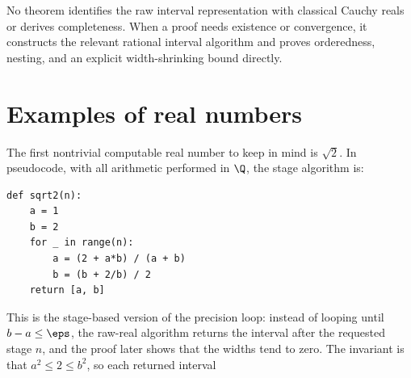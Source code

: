 \begin{remark}\label{rem:real-completeness}
No theorem identifies the raw interval representation with classical Cauchy
reals or derives completeness.  When a proof needs existence or convergence,
it constructs the relevant rational interval algorithm and proves orderedness,
nesting, and an explicit width-shrinking bound directly.
\end{remark}

\section{Examples of real numbers \humanchecked}

\begin{remark}
\label{rem:algebraic-numbers-sqrt-two}
The first nontrivial computable real number to keep in mind is \(\sqrt2\).
In pseudocode, with all arithmetic performed in \(\Q\), the stage algorithm is:
\begin{verbatim}
def sqrt2(n):
    a = 1
    b = 2
    for _ in range(n):
        a = (2 + a*b) / (a + b)
        b = (b + 2/b) / 2
    return [a, b]
\end{verbatim}
This is the stage-based version of the precision loop: instead of looping
until \(b-a\le\eps\), the raw-real algorithm returns the interval after the
requested stage \(n\), and the proof later shows that the widths tend to
zero.  The invariant is that \(a^2\le 2\le b^2\), so each returned interval

\end{remark}

